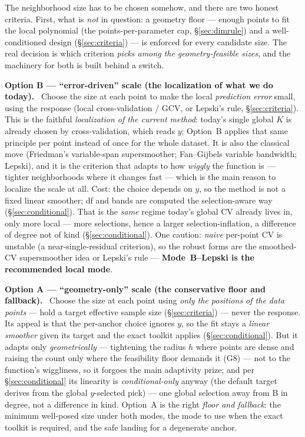 \documentclass[11pt]{article}
\newcommand{\field}[1]{\smallskip\noindent\textbf{\textsf{#1.}}\ }
\begin{document}
The neighborhood size has to be chosen somehow, and there are two honest criteria.
First, what is \emph{not} in question: a geometry floor --- enough points to fit the
local polynomial (the points-per-parameter cap, \S\ref{sec:dimrule}) and a
well-conditioned design (\S\ref{sec:criteria}) --- is enforced for every candidate size.
The real decision is which criterion \emph{picks among the geometry-feasible sizes}, and
the machinery for both is built behind a switch.

\field{Option B --- ``error-driven'' scale (the localization of what we do today)}
Choose the size at each point to make the local \emph{prediction error} small, using the
response (local cross-validation / GCV, or Lepski's rule, \S\ref{sec:criteria}). This is
the faithful \emph{localization of the current method}: today's single global $K$ is
already chosen by cross-validation, which reads $y$; Option~B applies that same principle
per point instead of once for the whole dataset. It is also the classical move
(Friedman's variable-span supersmoother; Fan--Gijbels variable bandwidth; Lepski), and
it is the criterion that adapts to how \emph{wiggly} the function is --- tighter
neighborhoods where it changes fast --- which is the main reason to localize the scale
at all. Cost: the choice depends on $y$, so the method is not a fixed linear smoother;
df and bands are computed the selection-aware way (\S\ref{sec:conditional}). That is the
\emph{same} regime today's global CV already lives in, only more local --- more
selections, hence a larger selection-inflation, a difference of degree not of kind
(\S\ref{sec:conditional}). One caution: \emph{naive} per-point CV is unstable (a
near-single-residual criterion), so the robust forms are the smoothed-CV supersmoother
idea or Lepski's rule --- \textbf{Mode~B--Lepski is the recommended local mode}.

\field{Option A --- ``geometry-only'' scale (the conservative floor and fallback)}
Choose the size at each point using \emph{only the positions of the data points} --- hold
a target effective sample size (\S\ref{sec:criteria}) --- never the response. Its appeal
is that the per-anchor choice ignores $y$, so the fit stays a \emph{linear smoother} given
its target and the exact toolkit applies (\S\ref{sec:conditional}). But it adapts only
\emph{geometrically} --- tightening the radius $h$ where points are dense and raising the
count only where the feasibility floor demands it (G8) --- not to the function's wiggliness,
so it forgoes the main adaptivity prize; and per \S\ref{sec:conditional} its linearity is
\emph{conditional-only} anyway
(the default target derives from the global $y$-selected pick) --- one global selection
away from B in degree, not a difference in kind. Option~A is the right \emph{floor and
fallback}: the minimum well-posed size under both modes, the mode to use when the exact
toolkit is required, and the safe landing for a degenerate anchor.
\end{document}
